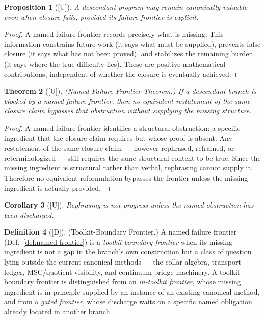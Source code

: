 \documentclass[12pt,oneside]{amsbook}
\theoremstyle{plain}
\newtheorem{theorem}{Theorem}[section]
\newtheorem{proposition}[theorem]{Proposition}
\newtheorem{corollary}[theorem]{Corollary}
\theoremstyle{definition}
\newtheorem{definition}[theorem]{Definition}
\theoremstyle{remark}
\newcommand{\status}[1]{\textup{[#1]}}
\begin{document}
\begin{proposition}[\status{U}]\label{prop:frontier-valuable}
A descendant program may remain canonically valuable even when closure
fails, provided its failure frontier is explicit.
\end{proposition}

\begin{proof}
A named failure frontier records precisely what is missing.  This
information constrains future work (it says what must be supplied),
prevents false closure (it says what has not been proved), and
stabilizes the remaining burden (it says where the true difficulty
lies).  These are positive mathematical contributions, independent of
whether the closure is eventually achieved.
\end{proof}

\begin{theorem}[\status{U}]\label{thm:frontier-stability}
\textup{(Named Failure Frontier Theorem.)}  If a descendant branch is
blocked by a named failure frontier, then no equivalent restatement of
the same closure claim bypasses that obstruction without supplying the
missing structure.
\end{theorem}

\begin{proof}
A named failure frontier identifies a structural obstruction: a
specific ingredient that the closure claim requires but whose proof
is absent.  Any restatement of the same closure claim --- however
rephrased, reframed, or reterminologized --- still requires the same
structural content to be true.  Since the missing ingredient is
structural rather than verbal, rephrasing cannot supply it.  Therefore
no equivalent reformulation bypasses the frontier unless the missing
ingredient is actually provided.
\end{proof}

\begin{corollary}[\status{U}]\label{cor:rephrasing-not-progress}
Rephrasing is not progress unless the named obstruction has been
discharged.
\end{corollary}

\begin{definition}[\status{D}]\label{def:toolkit-boundary-frontier}
\textup{(Toolkit-Boundary Frontier.)}
A named failure frontier (Def.~\ref{def:named-frontier}) is a
\emph{toolkit-boundary frontier} when its missing ingredient is not
a gap in the branch's own construction but a class of question lying
outside the current canonical methods --- the collar-algebra,
transport-ledger, MSC/quotient-visibility, and continuum-bridge
machinery.  A toolkit-boundary frontier is distinguished from an
\emph{in-toolkit frontier}, whose missing ingredient is in
principle supplied by an instance of an existing canonical method,
and from a \emph{gated frontier}, whose discharge waits on a
specific named obligation already located in another branch.
\end{definition}
\end{document}
